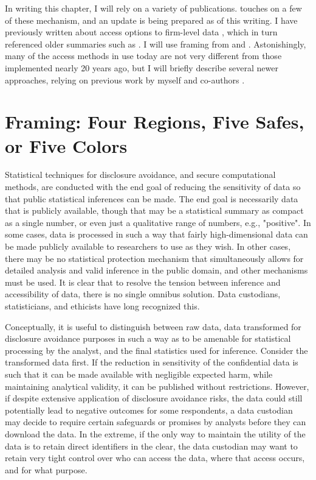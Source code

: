 In writing this chapter, I will rely on a variety of publications. \cite{fcsm_report_2005} touches on a few of these mechanism, and an update is being prepared as of this writing. I have previously written about access options to firm-level data \cite{vilhuber_methods_2013}, which in turn referenced older summaries such as \cite{weinberg_access_2007}. I will use framing from \cite{desai_five_2016} and \cite{altman_towards_2015}. Astonishingly, many of the access methods in use today are not very different from those implemented nearly 20 years ago, but I will briefly describe several newer approaches, relying on previous work by myself and co-authors \cite{shen_physically_2021}.

\section{Framing: Four Regions, Five Safes, or Five  Colors}

Statistical techniques for disclosure avoidance, and secure computational methods, are conducted with the end goal of reducing the sensitivity of  data so that public statistical inferences can be made. The end goal is necessarily data that is publicly available, though that may be a statistical summary as compact as a single number, or even just a qualitative range of numbers, e.g., "positive". In some cases, data is processed in such a way that fairly high-dimensional data can be made publicly available to researchers to use as they wish. In other cases, there may be no statistical protection mechanism that simultaneously allows for detailed analysis and valid inference in the public domain, and other mechanisms must be used. It is clear that to resolve the tension between inference and accessibility of data, there is no single omnibus solution. Data custodians, statisticians, and ethicists have long recognized this. 

Conceptually, it is useful to distinguish between raw data, data transformed for disclosure avoidance purposes in such a way as to be amenable for statistical processing by the analyst, and the final statistics used for inference. Consider the transformed data first. If the reduction in sensitivity of the confidential data is such that it can be made available with negligible expected harm, while maintaining analytical validity, it can be published without restrictions. However, if despite extensive application of disclosure avoidance risks, the data could still potentially lead to negative outcomes for some respondents, a data custodian may decide to require certain safeguards or promises by analysts before they can download the data. In the extreme, if the only way to maintain the utility of the data is to retain direct identifiers in the clear, the data custodian may want to retain very tight control over who can access the data, where that access occurs, and for what purpose. 

